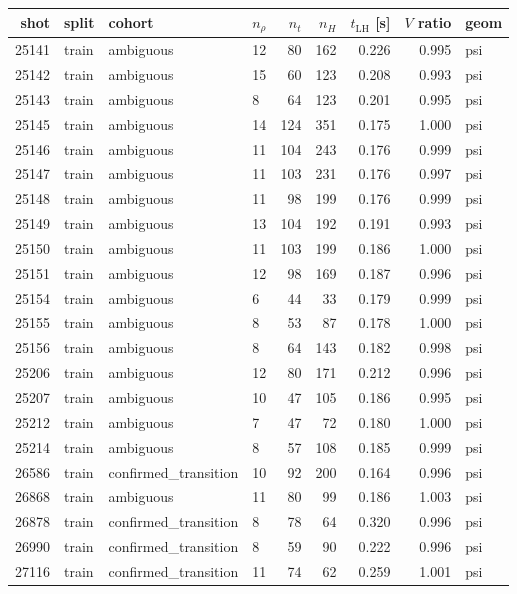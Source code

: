 \begin{longtable}{rlllrrrrl}
\toprule
shot & split & cohort & $n_\rho$ & $n_t$ & $n_H$ & $t_{\mathrm{LH}}$ [s] & $V$ ratio & geom \\
\midrule
\endhead
25141 & train & ambiguous & 12 & 80 & 162 & 0.226 & 0.995 & psi \\
25142 & train & ambiguous & 15 & 60 & 123 & 0.208 & 0.993 & psi \\
25143 & train & ambiguous & 8 & 64 & 123 & 0.201 & 0.995 & psi \\
25145 & train & ambiguous & 14 & 124 & 351 & 0.175 & 1.000 & psi \\
25146 & train & ambiguous & 11 & 104 & 243 & 0.176 & 0.999 & psi \\
25147 & train & ambiguous & 11 & 103 & 231 & 0.176 & 0.997 & psi \\
25148 & train & ambiguous & 11 & 98 & 199 & 0.176 & 0.999 & psi \\
25149 & train & ambiguous & 13 & 104 & 192 & 0.191 & 0.993 & psi \\
25150 & train & ambiguous & 11 & 103 & 199 & 0.186 & 1.000 & psi \\
25151 & train & ambiguous & 12 & 98 & 169 & 0.187 & 0.996 & psi \\
25154 & train & ambiguous & 6 & 44 & 33 & 0.179 & 0.999 & psi \\
25155 & train & ambiguous & 8 & 53 & 87 & 0.178 & 1.000 & psi \\
25156 & train & ambiguous & 8 & 64 & 143 & 0.182 & 0.998 & psi \\
25206 & train & ambiguous & 12 & 80 & 171 & 0.212 & 0.996 & psi \\
25207 & train & ambiguous & 10 & 47 & 105 & 0.186 & 0.995 & psi \\
25212 & train & ambiguous & 7 & 47 & 72 & 0.180 & 1.000 & psi \\
25214 & train & ambiguous & 8 & 57 & 108 & 0.185 & 0.999 & psi \\
26586 & train & confirmed\_transition & 10 & 92 & 200 & 0.164 & 0.996 & psi \\
26868 & train & ambiguous & 11 & 80 & 99 & 0.186 & 1.003 & psi \\
26878 & train & confirmed\_transition & 8 & 78 & 64 & 0.320 & 0.996 & psi \\
26990 & train & confirmed\_transition & 8 & 59 & 90 & 0.222 & 0.996 & psi \\
27116 & train & confirmed\_transition & 11 & 74 & 62 & 0.259 & 1.001 & psi \\

\end{longtable}
